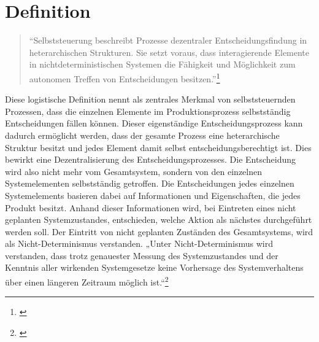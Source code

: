 \section{Definition}
\label{sec:Definition}

\begin{quote}
“Selbststeuerung beschreibt Prozesse dezentraler Entscheidungsfindung in
heterarchischen Strukturen. Sie setzt voraus, dass interagierende Elemente in
nichtdeterministischen Systemen die Fähigkeit und Möglichkeit zum autonomen
Treffen von Entscheidungen besitzen.”\footnote{\citet[S.~42]{huelsmann2005}}
\end{quote}

Diese logistische Definition nennt als zentrales Merkmal von selbststeuernden
Prozessen, dass die einzelnen Elemente im Produktionsprozess selbstständig
Entscheidungen fällen können. Dieser eigenständige Entscheidungsprozess kann
dadurch ermöglicht werden, dass der gesamte Prozess eine heterarchische Struktur
besitzt und jedes Element damit selbst entscheidungsberechtigt ist. Dies bewirkt
eine Dezentralisierung des Entscheidungsprozesses. Die Entscheidung wird also
nicht mehr vom Gesamtsystem, sondern von den einzelnen Systemelementen
selbstständig getroffen. Die Entscheidungen jedes einzelnen Systemelements
basieren dabei auf Informationen und Eigenschaften, die jedes Produkt besitzt.
Anhand dieser Informationen wird, bei Eintreten eines nicht geplanten
Systemzustandes, entschieden, welche Aktion als nächstes durchgeführt werden
soll. Der Eintritt von nicht geplanten Zuständen des Gesamtsystems, wird als
Nicht-Determinismus verstanden. „Unter Nicht-Determinismus wird verstanden, dass
trotz genauester Messung des Systemzustandes und der Kenntnis aller wirkenden
Systemgesetze keine Vorhersage des Systemverhaltens über einen längeren
Zeitraum möglich ist.“\footnote{\citet[S.~10]{boese2012}}
 